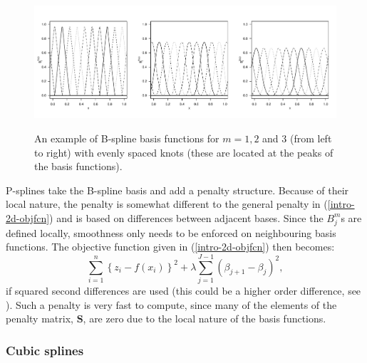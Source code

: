\begin{figure}[tb]
\centering
\includegraphics[width=\textwidth]{intro/figs/bspline-ex.pdf}\\
\caption{An example of B-spline basis functions for $m=1, 2$ and $3$ (from left to right) with evenly spaced knots (these are located at the peaks of the basis functions).}
\label{bs-basis}
\end{figure}

P-splines take the B-spline basis and add a penalty structure. Because of their local nature, the penalty is somewhat different to the general penalty in (\ref{intro-2d-objfcn}) and is based on differences between adjacent bases. Since the $B^m_j$s are defined locally, smoothness only needs to be enforced on neighbouring basis functions. The objective function given in (\ref{intro-2d-objfcn}) then becomes:
\begin{equation*}
\sum_{i=1}^n \left \{ z_i - f(x_i) \right \}^2 +  \lambda \sum_{j=1}^{J-1} (\beta_{j+1} - \beta_j)^2,
\end{equation*}
if squared second differences are used (this could be a higher order difference, see \cite{eilersmarx96}). Such a penalty is very fast to compute, since many of the elements of the penalty matrix, $\mathbf{S}$, are zero due to the local nature of the basis functions.


\subsubsection{Cubic splines}
\label{intro-cubic}
\label{cor-cubic}

